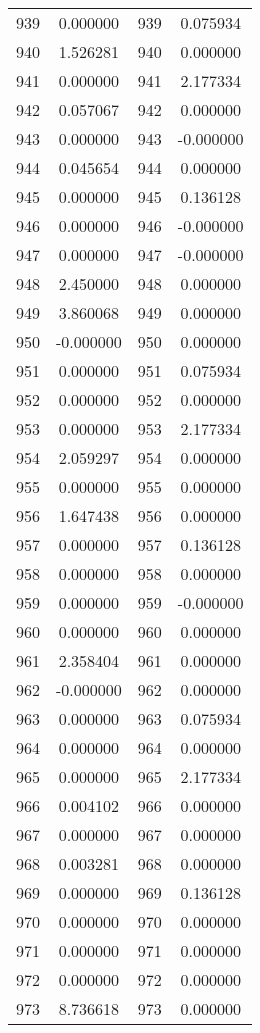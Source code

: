 \documentclass[12pt]{article}
\begin{document}
\begin{longtable}{@{}cccc@{}}
939 & 0.000000 & 939 & 0.075934 \\
940 & 1.526281 & 940 & 0.000000 \\
941 & 0.000000 & 941 & 2.177334 \\
942 & 0.057067 & 942 & 0.000000 \\
943 & 0.000000 & 943 & -0.000000 \\
944 & 0.045654 & 944 & 0.000000 \\
945 & 0.000000 & 945 & 0.136128 \\
946 & 0.000000 & 946 & -0.000000 \\
947 & 0.000000 & 947 & -0.000000 \\
948 & 2.450000 & 948 & 0.000000 \\
949 & 3.860068 & 949 & 0.000000 \\
950 & -0.000000 & 950 & 0.000000 \\
951 & 0.000000 & 951 & 0.075934 \\
952 & 0.000000 & 952 & 0.000000 \\
953 & 0.000000 & 953 & 2.177334 \\
954 & 2.059297 & 954 & 0.000000 \\
955 & 0.000000 & 955 & 0.000000 \\
956 & 1.647438 & 956 & 0.000000 \\
957 & 0.000000 & 957 & 0.136128 \\
958 & 0.000000 & 958 & 0.000000 \\
959 & 0.000000 & 959 & -0.000000 \\
960 & 0.000000 & 960 & 0.000000 \\
961 & 2.358404 & 961 & 0.000000 \\
962 & -0.000000 & 962 & 0.000000 \\
963 & 0.000000 & 963 & 0.075934 \\
964 & 0.000000 & 964 & 0.000000 \\
965 & 0.000000 & 965 & 2.177334 \\
966 & 0.004102 & 966 & 0.000000 \\
967 & 0.000000 & 967 & 0.000000 \\
968 & 0.003281 & 968 & 0.000000 \\
969 & 0.000000 & 969 & 0.136128 \\
970 & 0.000000 & 970 & 0.000000 \\
971 & 0.000000 & 971 & 0.000000 \\
972 & 0.000000 & 972 & 0.000000 \\
973 & 8.736618 & 973 & 0.000000 \\

\end{longtable}
\end{document}
